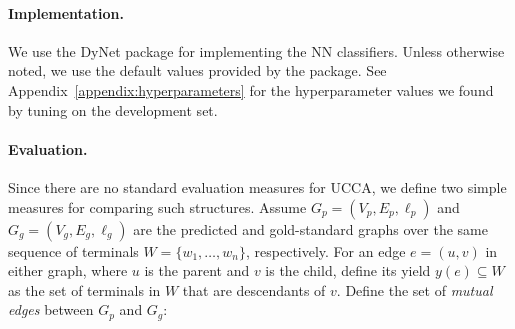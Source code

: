 \documentclass[11pt,a4paper]{article}
\begin{document}
\begin{table}
\caption{Statistics of the \textit{Wiki} and \textit{20K Leagues} UCCA corpora.
All counts exclude the root node, implicit nodes, and linkage nodes and edges.
}
\label{table:data}
\end{table}

\paragraph{Implementation.}
We use the DyNet package \cite{neubig2017dynet} for implementing the NN classifiers.
Unless otherwise noted, we use the default values provided by the package.
See Appendix~\ref{appendix:hyperparameters} for the hyperparameter values we found by tuning
on the development set.

\paragraph{Evaluation.}
Since there are no standard evaluation measures for UCCA, we define
two simple measures for comparing such structures.
Assume $G_p=(V_p,E_p,\ell_p)$ and $G_g=(V_g,E_g,\ell_g)$
are the predicted and gold-standard graphs over the same
sequence of terminals $W = \{w_1,\ldots,w_n\}$, respectively.
For an edge $e=(u,v)$ in either graph,
where $u$ is the parent and $v$ is the child, define its yield $y(e) \subseteq W$ as the
set of terminals in $W$ that are descendants of $v$.
Define the set of \textit{mutual edges} between $G_p$ and $G_g$:
\end{document}
